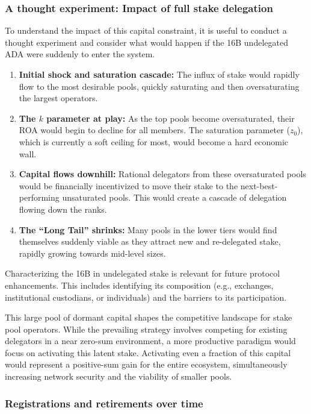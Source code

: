 \documentclass[11pt, letterpaper]{article}
\begin{document}
\subsubsection*{A thought experiment: Impact of full stake delegation}

To understand the impact of this capital constraint, it is useful to
conduct a thought experiment and consider what would happen if the 16B
undelegated ADA were suddenly to enter the system.

\begin{enumerate}
	\item \textbf{Initial shock and saturation cascade:} The influx of stake would rapidly flow to the most desirable pools,
	      quickly saturating and then oversaturating the largest operators.
	\item \textbf{The $k$ parameter at play:} As the top pools become oversaturated, their ROA would begin to decline
	      for all members. The saturation parameter ($z_0$), which is currently a soft ceiling for most, would become a hard economic wall.
	\item \textbf{Capital flows downhill:} Rational delegators from these oversaturated pools would be financially incentivized to
	      move their stake to the next-best-performing unsaturated pools. This would create a cascade of delegation flowing down the ranks.
	\item \textbf{The ``Long Tail'' shrinks:} Many pools in the lower tiers would find themselves suddenly viable as they attract
	      new and re-delegated stake, rapidly growing towards mid-level sizes.
\end{enumerate}

Characterizing the 16B in undelegated stake is relevant for future protocol enhancements. This
includes identifying its composition (e.g., exchanges, institutional custodians, or individuals) and
the barriers to its participation.

This large pool of dormant capital shapes the competitive landscape for stake
pool operators. While the prevailing strategy involves competing for existing
delegators in a near zero-sum environment, a more productive paradigm would
focus on activating this latent stake. Activating even a fraction of this
capital would represent a positive-sum gain for the entire ecosystem,
simultaneously increasing network security and the viability of smaller pools.

\subsubsection{Registrations and retirements over time}
\end{document}
